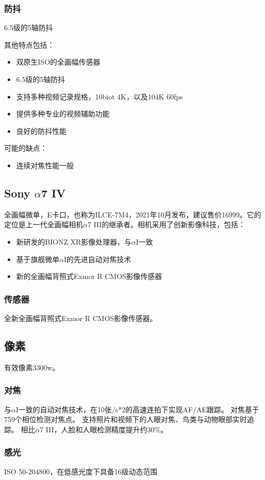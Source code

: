\documentclass{ctexart}
\begin{document}
\subsubsection{防抖}
6.5级的5轴防抖

其他特点包括：
\begin{itemize}
    \item 双原生ISO的全画幅传感器
    \item 6.5级的5轴防抖
    \item 支持多种视频记录规格，10biot 4K，以及104K 60fps
    \item 提供多种专业的视频辅助功能
    \item 良好的防抖性能
\end{itemize}
可能的缺点：
\begin{itemize}
    \item 连续对焦性能一般
\end{itemize}

\subsection{Sony $\alpha$7 IV~\cite{sony_alpha7_iv_announment}}
全画幅微单，E卡口，也称为ILCE-7M4，2021年10月发布，建议售价16999。它的定位是上一代全画幅相机$\alpha$7 III的继承者。相机采用了创新影像科技，包括：
\begin{itemize}
    \item 新研发的BIONZ XR影像处理器，与$\alpha$I一致
    \item 基于旗舰微单$\alpha$I的先进自动对焦技术
    \item 新的全画幅背照式Exmor R CMOS影像传感器
\end{itemize}
\subsubsection{传感器}
全新全画幅背照式Exmor R CMOS影像传感器。
\subsection{像素}
有效像素3300w。
\subsubsection{对焦}
与$\alpha$I一致的自动对焦技术，在10张/s*2的高速连拍下实现AF/AE跟踪。
对焦基于759个相位检测对焦点。
支持照片和视频下的人眼对焦、鸟类与动物眼部实时追踪。
相比$\alpha$7 III，人脸和人眼检测精度提升约30$\%$。
\subsubsection{感光}
ISO 50-204800，在低感光度下具备16级动态范围
\end{document}
